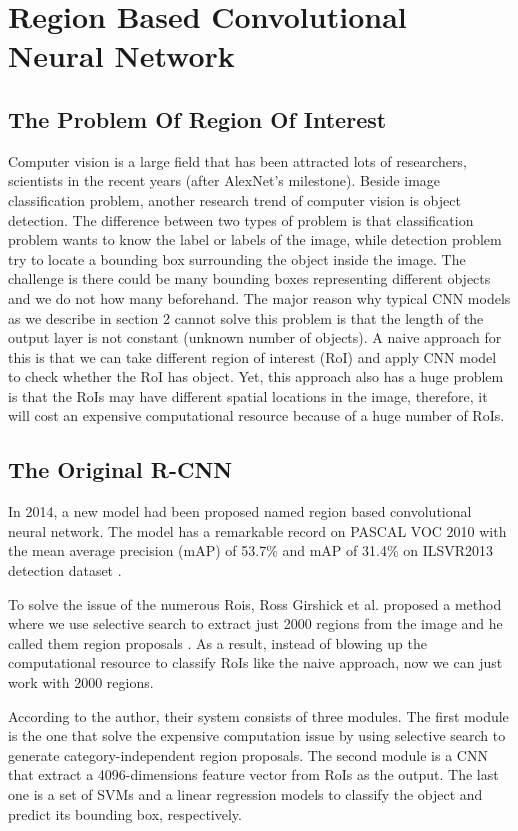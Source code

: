 \chapter{Region Based Convolutional Neural Network}
\section{The Problem Of Region Of Interest}
\label{section:problemofROI}
\noindent
	Computer vision is a large field that has been attracted lots of researchers, scientists in the recent years (after AlexNet’s milestone). Beside image classification problem, another research trend of computer vision is object detection. The difference between two types of problem is that classification problem wants to know the label or labels of the image, while detection problem try to locate a bounding box surrounding the object inside the image. The challenge is there could be many bounding boxes representing different objects and we do not how many beforehand. The major reason why typical CNN models as we describe in section 2 cannot solve this problem is that the length of the output layer is not constant (unknown number of objects). A naive approach for this is that we can take different region of interest (RoI) and apply CNN model to check whether the RoI has object. Yet, this approach also has a huge problem is that the RoIs may have different spatial locations in the image, therefore, it will cost an expensive computational resource because of a huge number of RoIs.
	
\section{The Original R-CNN}
\label{section:rcnn}
\noindent

	In 2014, a new model had been proposed named region based convolutional neural network. The model has a remarkable record on PASCAL VOC 2010 with the mean average precision (mAP) of 53.7\% and mAP of 31.4\% on ILSVR2013 detection dataset \cite{rcnn}.
	
	To solve the issue of the numerous Rois, Ross Girshick et al. proposed a method where we use selective search to extract just 2000 regions from the image and he called them region proposals \cite{rcnn}. As a result, instead of blowing up the computational resource to classify RoIs like the naive approach, now we can just work with 2000 regions.
	
	According to the author, their system consists of three modules. The first module is the one that solve the expensive computation issue by using selective search to generate category-independent region proposals. The second module is a CNN that extract a 4096-dimensions feature vector from RoIs as the output. The last one is a set of SVMs and a linear regression models to classify the object and predict its bounding box, respectively.
	
